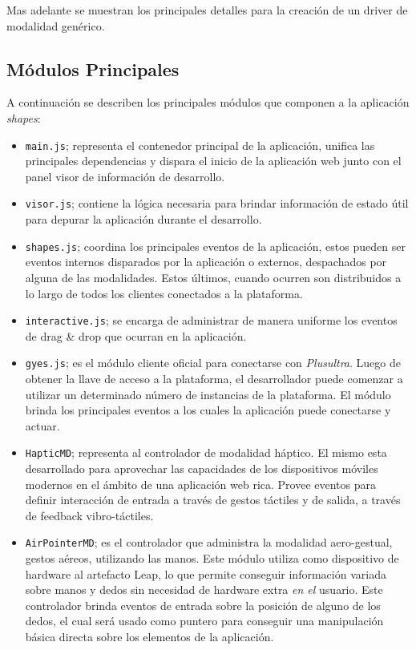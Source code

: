 Mas adelante se muestran los principales detalles para la creación de un driver de modalidad genérico. 

\subsection{Módulos Principales}

A continuación se describen los principales módulos que componen a la aplicación \emph{shapes}:
\begin{itemize}
\item \texttt{main.js}; representa el contenedor principal de la aplicación, unifica las principales dependencias y dispara el inicio de la aplicación web junto con el panel visor de información de desarrollo.

\item \texttt{visor.js}; contiene la lógica necesaria para brindar información de estado útil para depurar la aplicación durante el desarrollo.

\item \texttt{shapes.js}; coordina los principales eventos de la aplicación, estos pueden ser eventos internos disparados por la aplicación o externos, despachados por alguna de las modalidades. Estos últimos, cuando ocurren son distribuidos a lo largo de todos los clientes conectados a la plataforma.

\item \texttt{interactive.js}; se encarga de administrar de manera uniforme los eventos de drag \& drop que ocurran en la aplicación.

\item \texttt{gyes.js}; es el módulo cliente oficial para conectarse con \emph{Plusultra}. Luego de obtener la llave de acceso a la plataforma, el desarrollador puede comenzar a utilizar un determinado número de instancias de la plataforma. El módulo brinda los principales eventos a los cuales la aplicación puede conectarse y actuar.

\item \texttt{HapticMD}; representa al controlador de modalidad háptico. El mismo esta desarrollado para aprovechar las capacidades de los dispositivos móviles modernos en el ámbito de una aplicación web rica. Provee eventos para definir interacción de entrada a través de gestos táctiles y de salida, a través de feedback vibro-táctiles.

\item \texttt{AirPointerMD}; es el controlador que administra la modalidad aero-gestual, \ie gestos aéreos, utilizando las manos. Este módulo utiliza como dispositivo de hardware al artefacto Leap, lo que permite conseguir información variada sobre manos y dedos sin necesidad de hardware extra \emph{en el} usuario. Este controlador brinda eventos de entrada sobre la posición de alguno de los dedos, el cual será usado como puntero para conseguir una manipulación básica directa sobre los elementos de la aplicación.
\end{itemize}

